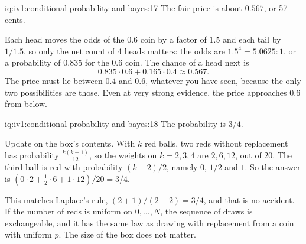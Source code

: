 \begin{solution}{iq:iv1:conditional-probability-and-bayes:17}
The fair price is about $0.567$, or 57 cents.

Each head moves the odds of the $0.6$ coin by a factor of $1.5$ and each tail by $1/1.5$, so only the net count of 4 heads matters: the odds are $1.5^4 = 5.0625 : 1$, or a probability of $0.835$ for the $0.6$ coin. The chance of a head next is
\[
0.835 \cdot 0.6 + 0.165 \cdot 0.4 \approx 0.567.
\]
The price must lie between $0.4$ and $0.6$, whatever you have seen, because the only two possibilities are those. Even at very strong evidence, the price approaches $0.6$ from below.

\end{solution}

\begin{solution}{iq:iv1:conditional-probability-and-bayes:18}
The probability is $3/4$.

Update on the box's contents. With $k$ red balls, two reds without replacement has probability $\frac{k(k-1)}{12}$, so the weights on $k = 2, 3, 4$ are $2, 6, 12$, out of 20. The third ball is red with probability $(k - 2)/2$, namely $0$, $1/2$ and $1$. So the answer is $(0 \cdot 2 + \tfrac12 \cdot 6 + 1 \cdot 12)/20 = 3/4$.

This matches Laplace's rule, $(2 + 1)/(2 + 2) = 3/4$, and that is no accident. If the number of reds is uniform on $0, \dots, N$, the sequence of draws is exchangeable, and it has the same law as drawing with replacement from a coin with uniform $p$. The size of the box does not matter.

\end{solution}

